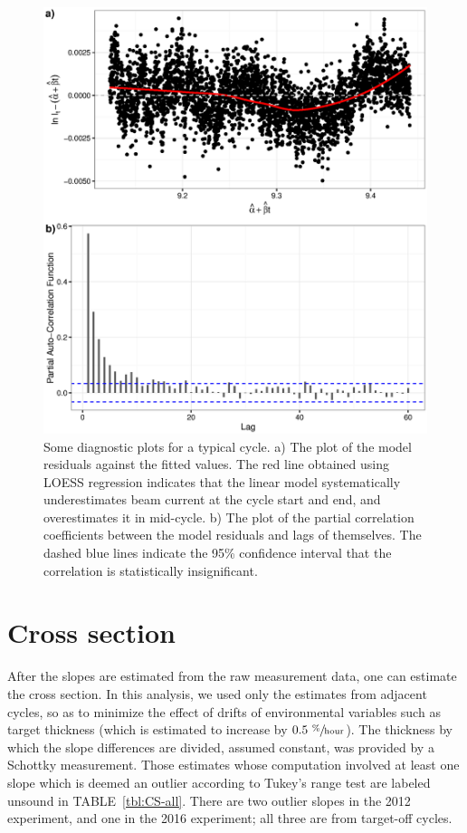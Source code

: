 \documentclass[reprint, superscriptaddress]{revtex4-1}
\newcommand{\scl}{.4}
\begin{document}
\begin{figure}
\centering
\includegraphics[scale=\scl]{img/DiagPlot_969.eps}
\caption{Some diagnostic plots for a typical cycle. a) The plot of the model residuals against the fitted values. The red line obtained using LOESS regression indicates that the linear model systematically underestimates beam current at the cycle start and end, and overestimates it in mid-cycle. b) The plot of the partial correlation coefficients between the model residuals and lags of themselves. The dashed blue lines indicate the 95\% confidence interval that the correlation is statistically insignificant.\label{fig:Run969}}
\end{figure}

\section{Cross section}
After the slopes are estimated from the raw measurement data, one can estimate the cross section. In this analysis, we used only the estimates from adjacent cycles, so as to minimize the effect of drifts of environmental variables such as target thickness (which is estimated to increase by $0.5~ \sfrac{\%}{\mathrm{hour}}$). The thickness by which the slope differences are divided, assumed constant, was provided by a Schottky measurement. Those estimates whose computation involved at least one slope which is deemed an outlier according to Tukey's range test are labeled unsound in TABLE~\ref{tbl:CS-all}. There are two outlier slopes in the 2012 experiment, and one in the 2016 experiment; all three are from target-off cycles.
\end{document}
